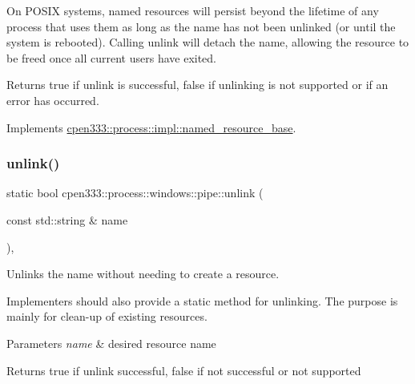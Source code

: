 On P\+O\+S\+IX systems, named resources will persist beyond the lifetime of any process that uses them as long as the name has not been unlinked (or until the system is rebooted). Calling {\ttfamily unlink} will detach the name, allowing the resource to be freed once all current users have exited.

\begin{DoxyReturn}{Returns}
{\ttfamily true} if unlink is successful, {\ttfamily false} if unlinking is not supported or if an error has occurred. 
\end{DoxyReturn}


Implements \hyperlink{classcpen333_1_1process_1_1impl_1_1named__resource__base_ae4033f82dfd068b917a9bca57d3a0c45}{cpen333\+::process\+::impl\+::named\+\_\+resource\+\_\+base}.

\mbox{\label{classcpen333_1_1process_1_1windows_1_1pipe_a82f71e3bb08dab1a32421062173d09da}} 
\subsubsection{\texorpdfstring{unlink()}{unlink()}\hspace{0.1cm}{\footnotesize\ttfamily [2/2]}}
{\footnotesize\ttfamily static bool cpen333\+::process\+::windows\+::pipe\+::unlink (\begin{DoxyParamCaption}\item[{const std\+::string \&}]{name }\end{DoxyParamCaption})\hspace{0.3cm}{\ttfamily [inline]}, {\ttfamily [static]}}



Unlinks the name without needing to create a resource. 

Implementers should also provide a static method for unlinking. The purpose is mainly for clean-\/up of existing resources.


\begin{DoxyParams}{Parameters}
{\em name} & desired resource name \\
\hline
\end{DoxyParams}
\begin{DoxyReturn}{Returns}
{\ttfamily true} if unlink successful, {\ttfamily false} if not successful or not supported 
\end{DoxyReturn}
\mbox{\label{classcpen333_1_1process_1_1windows_1_1pipe_a633e73bc0c412b17a9c536251a746500}} 
